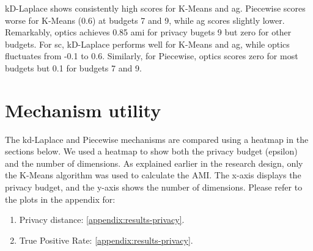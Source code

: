 \begin{figure}[H]
\begin{subfigure}{1\textwidth}
      \end{subfigure}
      \label{fig:validation-heart-dataset_comparison_nd-laplace}
\end{figure}
kD-Laplace shows consistently high scores for K-Means and \gls{ag}.
Piecewise scores worse for K-Means (0.6) at budgets 7 and 9, while \gls{ag} scores slightly lower.
Remarkably, \gls{optics} achieves 0.85 \gls{ami} for privacy bugets 9 but zero for other budgets. For \gls{sc}, kD-Laplace performs well for K-Means and \gls{ag}, while \gls{optics} fluctuates from -0.1 to 0.6.
Similarly, for Piecewise, \gls{optics} scores zero for most budgets but 0.1 for budgets 7 and 9.

\newpage
\section{Mechanism utility}
The kd-Laplace and Piecewise mechanisms are compared using a heatmap in the sections below.
We used a heatmap to show both the privacy budget (epsilon) and the number of dimensions.
As explained earlier in the research design, only the K-Means algorithm was used to calculate the AMI.
The x-axis displays the privacy budget, and the y-axis shows the number of dimensions. \newline
Please refer to the plots in the appendix for:
\begin{enumerate}
      \item Privacy distance: \ref{appendix:results-privacy}.
      \item True Positive Rate: \ref{appendix:results-privacy}.
\end{enumerate}
\newpage

